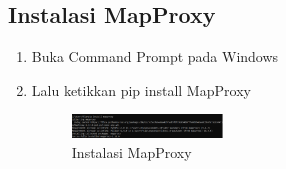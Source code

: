 \subsection{Instalasi MapProxy}
\begin{enumerate}
	\item Buka Command Prompt pada Windows
	\item Lalu ketikkan pip install MapProxy
	\hfill\break
	\begin{figure}[H]
		\includegraphics[width=4cm]{figures/tugas4/1174086/mapproxy.png}
		\centering
		\caption{Instalasi MapProxy}
	\end{figure}
\end{enumerate}

